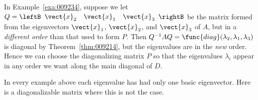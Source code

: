 In Example~\ref{exa:009234}, suppose we let $Q = \leftB \begin{array}{ccc} \vect{x}_{2} & \vect{x}_{1} & \vect{x}_{3} \end{array} \rightB$ be the matrix formed from the eigenvectors $\vect{x}_{1}$, $\vect{x}_{2}$, and $\vect{x}_{3}$ of $A$, but in a \textit{different order} than that used to form $P$. Then $Q^{-1}AQ = \func{diag}(\lambda_{2}, \lambda_{1}, \lambda_{3})$ is diagonal by Theorem~\ref{thm:009214}, but the eigenvalues are in the \textit{new} order. Hence we can choose the diagonalizing matrix $P$ so that the eigenvalues $\lambda_{i}$ appear in any order we want along the main diagonal of $D$.


In
 every example above each eigenvalue has had only one basic eigenvector.
 Here is a diagonalizable matrix where this is not the case.


